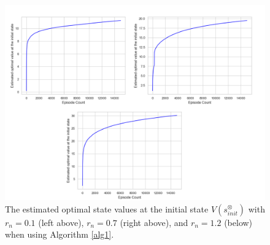 \documentclass[10 pt, dvipdfmx]{article}
\theoremstyle{definition}
\begin{document}
\begin{figure}[htbp]
   \centering
   \vspace{2mm}
   \includegraphics[width = 12cm]{max_Q_value_15000_5000_rn_all_rsink_1000.png}
   \caption{The estimated optimal state values at the initial state $V(s^{\otimes}_{init})$ with $r_{n} = 0.1$ (left above), $r_n = 0.7$ (right above), and $r_n = 1.2$ (below) when using Algorithm \ref{alg1}.}
   \label{result1}
\end{figure}
\end{document}
